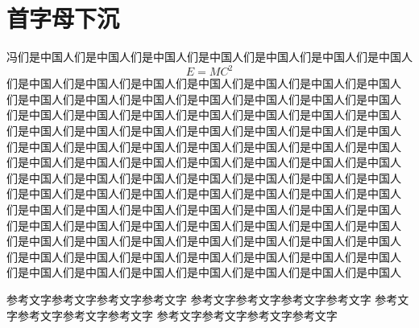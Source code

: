 \documentclass[a4paper,fontset = windowsnew]{ctexbook}
\begin{document}
\chapter{首字母下沉}

冯们是中国人们是中国人们是中国人们是中国人们是中国人们是中国人们是中国人
\[E=MC^2\]
们是中国人们是中国人们是中国人们是中国人们是中国人们是中国人们是中国人
们是中国人们是中国人们是中国人们是中国人们是中国人们是中国人们是中国人
们是中国人们是中国人们是中国人们是中国人们是中国人们是中国人们是中国人
们是中国人们是中国人们是中国人们是中国人们是中国人们是中国人们是中国人
们是中国人们是中国人们是中国人们是中国人们是中国人们是中国人们是中国人
们是中国人们是中国人们是中国人们是中国人们是中国人们是中国人们是中国人
们是中国人们是中国人们是中国人们是中国人们是中国人们是中国人们是中国人
们是中国人们是中国人们是中国人们是中国人们是中国人们是中国人们是中国人
们是中国人们是中国人们是中国人们是中国人们是中国人们是中国人们是中国人
们是中国人们是中国人们是中国人们是中国人们是中国人们是中国人们是中国人
们是中国人们是中国人们是中国人们是中国人们是中国人们是中国人们是中国人
们是中国人们是中国人们是中国人们是中国人们是中国人们是中国人们是中国人
们是中国人们是中国人们是中国人们是中国人们是中国人们是中国人们是中国人

参考文字参考文字参考文字参考文字
参考文字参考文字参考文字参考文字
参考文字参考文字参考文字参考文字
参考文字参考文字参考文字参考文字
\end{document}
